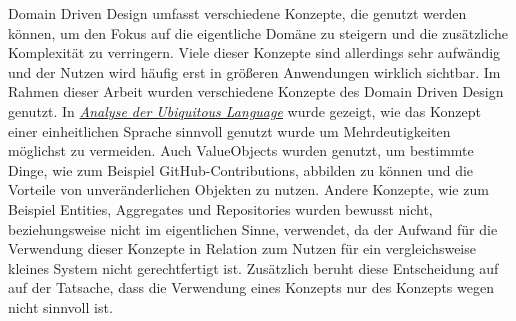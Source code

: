 Domain Driven Design umfasst verschiedene Konzepte, die genutzt werden können, um den Fokus auf die eigentliche Domäne zu steigern und die zusätzliche Komplexität zu verringern.
Viele dieser Konzepte sind allerdings sehr aufwändig und der Nutzen wird häufig erst in größeren Anwendungen wirklich sichtbar.
Im Rahmen dieser Arbeit wurden verschiedene Konzepte des Domain Driven Design genutzt.
In \hyperref[sec:ubiq_lang]{\textit{Analyse der Ubiquitous Language}} wurde gezeigt, wie das Konzept einer einheitlichen Sprache sinnvoll genutzt wurde um Mehrdeutigkeiten möglichst zu vermeiden.
Auch ValueObjects wurden genutzt, um bestimmte Dinge, wie zum Beispiel GitHub-Contributions, abbilden zu können und die Vorteile von unveränderlichen Objekten zu nutzen.
Andere Konzepte, wie zum Beispiel Entities, Aggregates und Repositories wurden bewusst nicht, beziehungsweise nicht im eigentlichen Sinne, verwendet, da der Aufwand für die Verwendung dieser Konzepte in Relation zum Nutzen für ein vergleichsweise kleines System nicht gerechtfertigt ist.
Zusätzlich beruht diese Entscheidung auf auf der Tatsache, dass die Verwendung eines Konzepts nur des Konzepts wegen nicht sinnvoll ist.